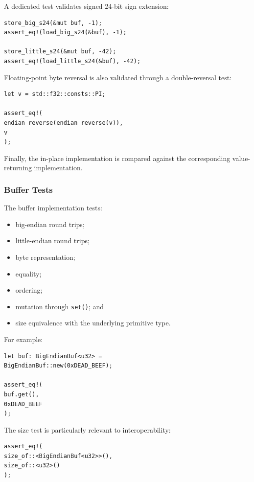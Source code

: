 A dedicated test validates signed 24-bit sign extension:

\begin{lstlisting}[style=rustblock]
store_big_s24(&mut buf, -1);
assert_eq!(load_big_s24(&buf), -1);

store_little_s24(&mut buf, -42);
assert_eq!(load_little_s24(&buf), -42);
\end{lstlisting}

Floating-point byte reversal is also validated through a double-reversal test:

\begin{lstlisting}[style=rustblock]
let v = std::f32::consts::PI;

assert_eq!(
endian_reverse(endian_reverse(v)),
v
);
\end{lstlisting}

Finally, the in-place implementation is compared against the corresponding value-returning implementation.

\subsubsection{Buffer Tests}

The buffer implementation tests:

\begin{itemize}
\item big-endian round trips;
\item little-endian round trips;
\item byte representation;
\item equality;
\item ordering;
\item mutation through \texttt{set()}; and
\item size equivalence with the underlying primitive type.
\end{itemize}

For example:

\begin{lstlisting}[style=rustblock]
let buf: BigEndianBuf<u32> =
BigEndianBuf::new(0xDEAD_BEEF);

assert_eq!(
buf.get(),
0xDEAD_BEEF
);
\end{lstlisting}

The size test is particularly relevant to interoperability:

\begin{lstlisting}[style=rustblock]
assert_eq!(
size_of::<BigEndianBuf<u32>>(),
size_of::<u32>()
);
\end{lstlisting}

